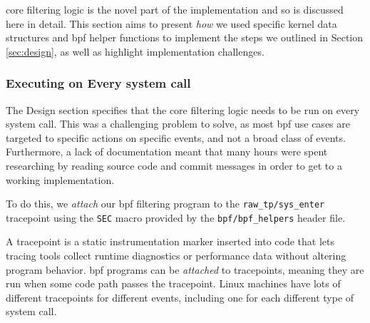 \afg core filtering logic is the novel part of the implementation and so is
discussed here in detail. This section aims to present \textit{how} we used
specific kernel data structures and \ac{bpf} helper functions to implement the
steps we outlined in Section \ref{sec:design}, as well as highlight
implementation challenges.

\subsubsection{Executing on Every system call}

The Design section specifies that the core filtering logic needs to be run on
every system call. This was a challenging problem to solve, as most \ac{bpf}
use cases are targeted to specific actions on specific events, and not a broad
class of events. Furthermore, a lack of documentation meant that many hours were
spent researching by reading source code and commit messages in order to get to
a working implementation.

To do this, we \textit{attach} our \ac{bpf} filtering program to
the \texttt{raw\_tp/sys\_enter} tracepoint using the \texttt{SEC} macro provided
by the \texttt{bpf/bpf\_helpers} header file.

A tracepoint is a static instrumentation marker inserted into code that lets tracing 
tools collect runtime diagnostics or performance data without altering program 
behavior. \ac{bpf} programs can be \textit{attached} to tracepoints, meaning they 
are run when some code path passes the tracepoint. Linux machines have lots of 
different tracepoints for different events, including one for each different type of 
system call. 

